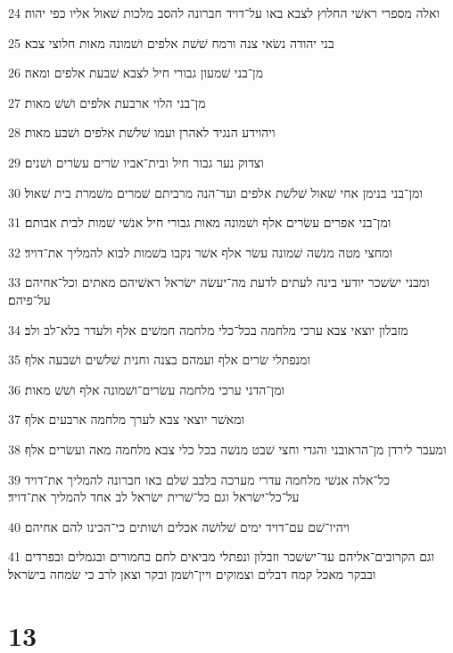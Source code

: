 \par 24 ואלה מספרי ראשׁי החלוץ לצבא באו על־דויד חברונה להסב מלכות שׁאול אליו כפי יהוה׃
\par 25 בני יהודה נשׂאי צנה ורמח שׁשׁת אלפים ושׁמונה מאות חלוצי צבא׃
\par 26 מן־בני שׁמעון גבורי חיל לצבא שׁבעת אלפים ומאה׃
\par 27 מן־בני הלוי ארבעת אלפים ושׁשׁ מאות׃
\par 28 ויהוידע הנגיד לאהרן ועמו שׁלשׁת אלפים ושׁבע מאות׃
\par 29 וצדוק נער גבור חיל ובית־אביו שׂרים עשׂרים ושׁנים׃
\par 30 ומן־בני בנימן אחי שׁאול שׁלשׁת אלפים ועד־הנה מרביתם שׁמרים משׁמרת בית שׁאול׃
\par 31 ומן־בני אפרים עשׂרים אלף ושׁמונה מאות גבורי חיל אנשׁי שׁמות לבית אבותם׃
\par 32 ומחצי מטה מנשׁה שׁמונה עשׂר אלף אשׁר נקבו בשׁמות לבוא להמליך את־דויד׃
\par 33 ומבני ישׂשכר יודעי בינה לעתים לדעת מה־יעשׂה ישׂראל ראשׁיהם מאתים וכל־אחיהם על־פיהם׃
\par 34 מזבלון יוצאי צבא ערכי מלחמה בכל־כלי מלחמה חמשׁים אלף ולעדר בלא־לב ולב׃
\par 35 ומנפתלי שׂרים אלף ועמהם בצנה וחנית שׁלשׁים ושׁבעה אלף׃
\par 36 ומן־הדני ערכי מלחמה עשׂרים־ושׁמונה אלף ושׁשׁ מאות׃
\par 37 ומאשׁר יוצאי צבא לערך מלחמה ארבעים אלף׃
\par 38 ומעבר לירדן מן־הראובני והגדי וחצי שׁבט מנשׁה בכל כלי צבא מלחמה מאה ועשׂרים אלף׃
\par 39 כל־אלה אנשׁי מלחמה עדרי מערכה בלבב שׁלם באו חברונה להמליך את־דויד על־כל־ישׂראל וגם כל־שׁרית ישׂראל לב אחד להמליך את־דויד׃
\par 40 ויהיו־שׁם עם־דויד ימים שׁלושׁה אכלים ושׁותים כי־הכינו להם אחיהם׃
\par 41 וגם הקרובים־אליהם עד־ישׂשכר וזבלון ונפתלי מביאים לחם בחמורים ובגמלים ובפרדים ובבקר מאכל קמח דבלים וצמוקים ויין־ושׁמן ובקר וצאן לרב כי שׂמחה בישׂראל׃

\chapter{13}

